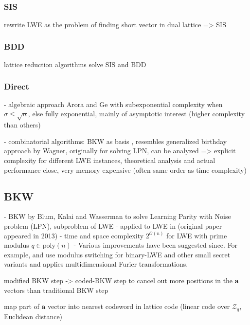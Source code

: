 \subsubsection{SIS}
rewrite LWE as the problem of finding short vector in dual lattice => SIS
\subsubsection{BDD}

lattice reduction algorithms solve SIS and BDD 
\subsubsection{Direct}

- algebraic approach Arora and Ge with subexponential complexity when $\sigma \leq \sqrt{n}$, else fully exponential, mainly of asymptotic interest (higher complexity than others)

- combinatorial algorithms: BKW as basis \cite{BKW03}, resembles generalized birthday approach by Wagner, %
originally for solving LPN, can be analyzed => explicit complexity for different LWE instances, theoretical analysis and actual performance close,
very memory expensive (often same order as time complexity) 

\subsection{BKW \cite{BKW03}}

- BKW by Blum, Kalai and Wasserman \cite{BKW03} to solve Learning Parity with Noise problem (LPN), subproblem of LWE
- applied to LWE in \cite{ACFFP15a} (original paper appeared in 2013)
- time and space complexity $2^{\mathcal{O}(n)}$ for LWE with prime modulus $q \in \text{poly}(n)$ %
- Various improvements have been suggested since. For example, \cite{AFFP14} and \cite{KF15} use modulus switching for binary-LWE and other small secret variants \cite{AFFP14} and \cite{DTV15} applies multidimensional Furier transformations. %

modified BKW step -> coded-BKW step to cancel out more positions in the $\mathbf{a}$ vectors than traditional BKW step

map part of $\mathbf{a}$ vector into nearest codeword in lattice code (linear code over $\mathcal{Z}_q$, Euclidean distance)

